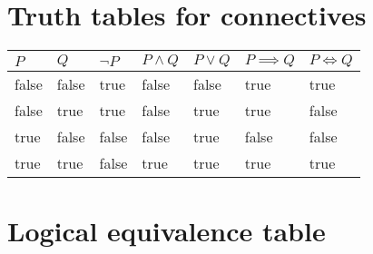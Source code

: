\documentclass{article}
\begin{document}
\newpage

\section*{Truth tables for connectives}

\begin{center}
    \begin{table}[h]
        \begin{tabular}{|l|l||l|l|l|l|l|}
        \hline
        $P$   & $Q$   & $\neg P$ & $P \land Q$ & $P \lor Q$ & $P \implies Q$ & $P \iff Q$ \\
        \hline
        \hline
        false & false & true    & false      & false      & true           & true       \\
        \hline
        false & true  & true    & false      & true       & true           & false      \\
        \hline
        true  & false & false   & false      & true       & false          & false      \\
        \hline
        true  & true  & false   & true       & true       & true           & true       \\
        \hline
        \end{tabular}
    \end{table}
\end{center}

\section*{Logical equivalence table}
\end{document}
